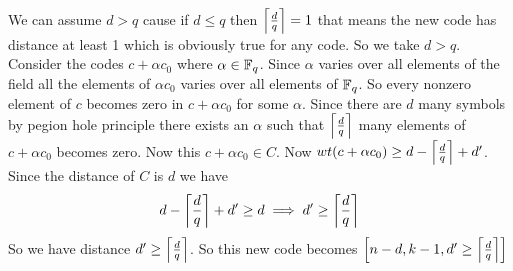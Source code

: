 \documentclass[a4paper, 11pt]{article}
\begin{document}
{\begin{enumerate}[label=(\alph*)]
		We can assume $d>q$ cause if $d\leq q$ then $\left\lceil \frac{d}{q}\right\rceil=1$ that means the new code has distance at least 1 which is obviously true for any code. So we take $d>q$. Consider the codes $c+\alpha c_0$ where $\alpha\in\mathbb{F}_q$. Since $\alpha $ varies over all elements of the field all the elements of $\alpha c_0$ varies over all elements of $\mathbb{F}_q$. So every nonzero element of $c$ becomes zero in $c+\alpha c_0$ for some $\alpha $. Since there are $d$ many symbols by pegion hole principle there exists an $\alpha $ such that  $\left\lceil \frac{d}{q}\right\rceil$ many elements of $c+\alpha c_0$ becomes zero. Now this $c+\alpha c_0\in C$. Now $wt(c+\alpha c_0)\geq d-\left\lceil\frac{d}{q}\right\rceil +d'$. Since the distance of $C$ is $d$ we have $$d-\left\lceil \frac{d}{q}\right\rceil+d'\geq d\implies d'\geq \left\lceil \frac{d}{q}\right\rceil$$So we have distance $d'\geq \left\lceil \frac{d}{q}\right\rceil$. So this new code becomes $\left[n-d,k-1,d'\geq  \left\lceil \frac{d}{q}\right\rceil \right]$
		 

\end{enumerate}}
\end{document}
